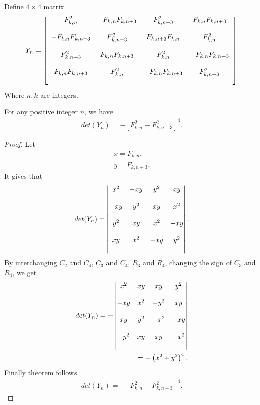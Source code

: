 \begin{definition}
Define $4 \times 4$ matrix 
\begin{align*}
Y_n = {\left[
          \begin{array}{cccc}
           \bigskip
            F_{k,n}^2 & -F_{k,n}F_{k,n+3} & F_{k,n+3}^2& F_{k,n}F_{k,n+3} \\
             \bigskip
            -F_{k,n}F_{k,n+3}  & F_{k,n+3}^2 & F_{k,n+3}F_{k,n} & F_{k,n}^2 \\
             \bigskip
            F_{k,n+3}^2 & F_{k,n}F_{k,n+3} & F_{k,n}^2& -F_{k,n}F_{k,n+3} \\
            \bigskip
            F_{k,n}F_{k,n+3}  & F_{k,n}^2 & - F_{k,n} F_{k,n+3}& F_{k,n+3}^2 \\
       \end{array}
        \right]}
\end{align*}
Where $n, k$ are integers.
\end{definition}
\begin{theorem}
For any positive integer $n$, we have
\begin{align*}
det (Y_n) = -\left[ F_{k,n}^2 + F_{k,n+3}^2\right]^4.
\end{align*}
\end{theorem}
\begin{proof}
Let
\begin{align*}
x= F_{k, n},\\
y = F_{k, n+3}.
\end{align*}
It gives that 
\begin{align*}
det (Y_n) = \begin{vmatrix}
               \bigskip
           x^2 & -xy & y^2& xy \\
             \bigskip
            -xy  & y^2 & xy & x^2 \\
             \bigskip
            y^2 & xy & x^2& -xy \\
            \bigskip
            xy  & x^2 & - xy& y^2 \\
       \end{vmatrix}.
\end{align*}
By interchanging $C_2$ and $C_4$, $C_3$ and $C_4$, $R_3$ and $R_4$, changing the sign of $C_3$ and $R_4$, we get 
\begin{align*}
det (Y_n)= - \begin{vmatrix}
           \bigskip
           x^2 & xy & xy& y^2 \\
             \bigskip
            -xy  & x^2 & -y^2 & xy \\
             \bigskip
            xy &y^2 & -x^2& -xy \\
            \bigskip
            -y^2  & xy & xy & -x^2 \\
      \end{vmatrix}\\
    = - \left( x^2 + y^2\right)^4 .   
 \end{align*}
Finally theorem follows
\begin{align*}
det (Y_n) = -\left[ F_{k,n}^2 + F_{k,n+3}^2\right]^4.
\end{align*}
\end{proof}
